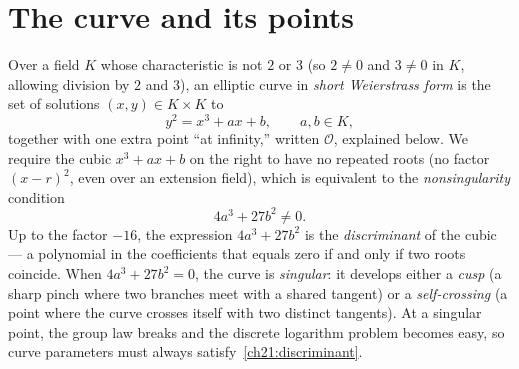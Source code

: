 \section{The curve and its points}
\label{ch21:curve}

Over a field $K$ whose characteristic is not $2$ or $3$ (so $2 \neq 0$ and $3 \neq 0$ in
$K$, allowing division by $2$ and $3$), an elliptic curve in \emph{short Weierstrass form}
is the set of solutions $(x,y) \in K \times K$ to
\begin{equation}
\label{ch21:weierstrass}
y^2 = x^3 + ax + b, \qquad a,b \in K,
\end{equation}
together with one extra point ``at infinity,'' written $\mathcal{O}$, explained below. We
require the cubic $x^3 + ax + b$ on the right to have no repeated roots (no factor
$(x - r)^2$, even over an extension field), which is equivalent to the
\emph{nonsingularity} condition
\begin{equation}
\label{ch21:discriminant}
4a^3 + 27 b^2 \neq 0.
\end{equation}
Up to the factor $-16$, the expression $4a^3 + 27b^2$ is the \emph{discriminant} of the
cubic --- a polynomial in the coefficients that equals zero if and only if two roots
coincide. When $4a^3 + 27b^2 = 0$, the curve is \emph{singular}: it develops either a
\emph{cusp} (a sharp pinch where two branches meet with a shared tangent) or a
\emph{self-crossing} (a point where the curve crosses itself with two distinct tangents).
At a singular point, the group law breaks and the discrete logarithm problem becomes easy,
so curve parameters must always satisfy~\eqref{ch21:discriminant}.


